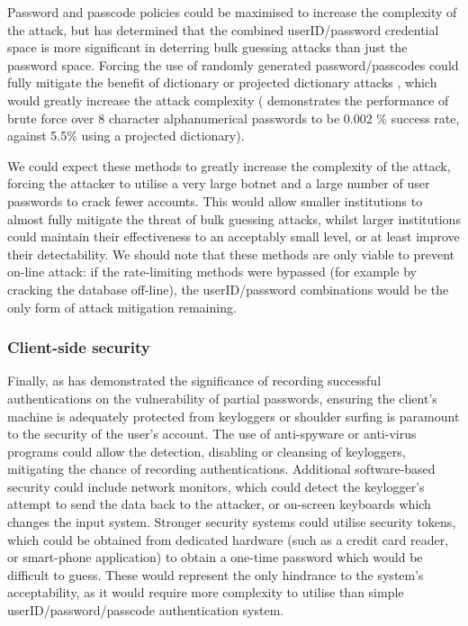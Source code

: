 \documentclass[british,10pt,a4paper]{article}
\begin{document}
Password and passcode policies could be maximised to increase the complexity of the attack, but \citet{Florencio2007-yp} has determined that the combined userID/password credential space is more significant in deterring bulk guessing attacks than just the password space. Forcing the use of randomly generated password/passcodes could fully mitigate the benefit of dictionary or projected dictionary attacks \cite{Kosamkar_undated-ik}, which would greatly increase the attack complexity (\citet{Aspinall2013-sh} demonstrates the performance of brute force over 8 character alphanumerical passwords to be 0.002 \% success rate, against 5.5\% using a projected dictionary).

We could expect these methods to greatly increase the complexity of the attack, forcing the attacker to utilise a very large botnet and a large number of user passwords to crack fewer accounts. This would allow smaller institutions to almost fully mitigate the threat of bulk guessing attacks, whilst larger institutions could maintain their effectiveness to an acceptably small level, or at least improve their detectability. We should note that these methods are only viable to prevent on-line attack: if the rate-limiting methods were bypassed (for example by cracking the database off-line), the userID/password combinations would be the only form of attack mitigation remaining.

\subsubsection{Client-side security}
Finally, as \citet{Aspinall2013-sh} has demonstrated the significance of recording successful authentications on the vulnerability of partial passwords, ensuring the client's machine is adequately protected from keyloggers or shoulder surfing is paramount to the security of the user's account. The use of anti-spyware or anti-virus programs could allow the detection, disabling or cleansing of keyloggers, mitigating the chance of recording authentications. Additional software-based security could include network monitors, which could detect the keylogger's attempt to send the data back to the attacker, or on-screen keyboards which changes the input system. Stronger security systems could utilise security tokens, which could be obtained from dedicated hardware (such as a credit card reader, or smart-phone application) to obtain a one-time password which would be difficult to guess. These would represent the only hindrance to the system's acceptability, as it would require more complexity to utilise than simple userID/password/passcode authentication system. 
\end{document}
